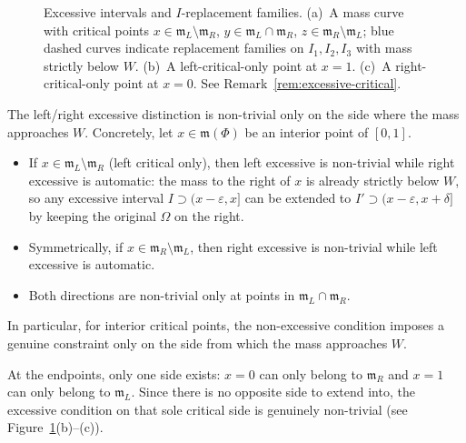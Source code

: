 \begin{figure}[H]
    \caption{Excessive intervals and $I$-replacement families. (a)~A mass curve with critical points $x \in \mathfrak{m}_L \setminus \mathfrak{m}_R$, $y \in \mathfrak{m}_L \cap \mathfrak{m}_R$, $z \in \mathfrak{m}_R \setminus \mathfrak{m}_L$; blue dashed curves indicate replacement families on $I_1, I_2, I_3$ with mass strictly below $W$. (b)~A left-critical-only point at $x = 1$. (c)~A right-critical-only point at $x = 0$. See Remark~\ref{rem:excessive-critical}.}
    \label{fig:excessive-remark}
\end{figure}

\begin{remark}\label{rem:excessive-critical}
The left/right excessive distinction is non-trivial only on the side where the mass approaches $W$. Concretely, let $x \in \mathfrak{m}(\Phi)$ be an interior point of $[0,1]$.
\begin{itemize}
    \item If $x \in \mathfrak{m}_L \setminus \mathfrak{m}_R$ (left critical only), then left excessive is non-trivial while right excessive is automatic: the mass to the right of $x$ is already strictly below $W$, so any excessive interval $I \supset (x - \varepsilon, x]$ can be extended to $I' \supset (x - \varepsilon, x + \delta]$ by keeping the original $\Omega$ on the right.
    \item Symmetrically, if $x \in \mathfrak{m}_R \setminus \mathfrak{m}_L$, then right excessive is non-trivial while left excessive is automatic.
    \item Both directions are non-trivial only at points in $\mathfrak{m}_L \cap \mathfrak{m}_R$.
\end{itemize}
In particular, for interior critical points, the non-excessive condition imposes a genuine constraint only on the side from which the mass approaches $W$.

At the endpoints, only one side exists: $x = 0$ can only belong to $\mathfrak{m}_R$ and $x = 1$ can only belong to $\mathfrak{m}_L$. Since there is no opposite side to extend into, the excessive condition on that sole critical side is genuinely non-trivial (see Figure~\ref{fig:excessive-remark}(b)--(c)).
\end{remark}


